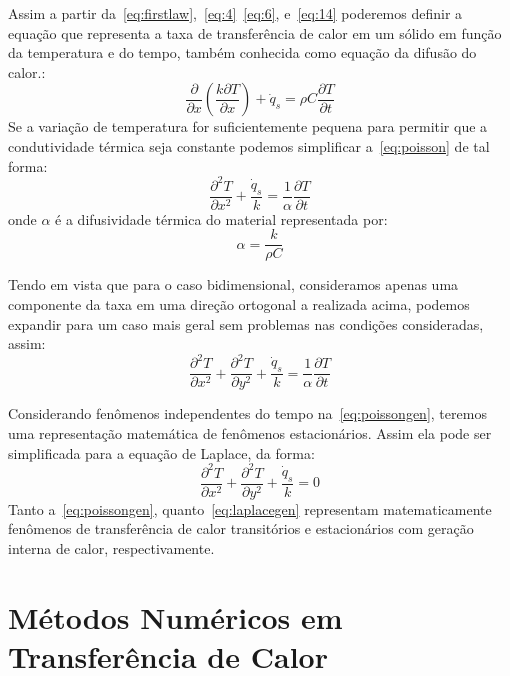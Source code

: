 \documentclass[
	12pt,				  %
	openright,		%
	twoside,			%
	a4paper,			%
	chapter=TITLE,		    %
	english,			%
	brazil				%
	]{abntex2}
\begin{document}
Assim a partir
da~\autoref{eq:firstlaw},~\autoref{eq:4}~\autoref{eq:6}, e~\autoref{eq:14}
poderemos definir a equação que representa a taxa de transferência de
calor em um sólido em função da temperatura e do tempo, também
conhecida como equação da difusão do calor.:
\begin{equation}
    \frac{\partial}{\partial x}\left( \frac{k \partial T}{\partial x}
    \right) + \dot{q}_s = \rho C \frac{\partial T}{\partial t}
    \label{eq:poisson}
\end{equation}
Se a variação de temperatura for suficientemente pequena para permitir que a
condutividade térmica seja constante podemos simplificar a~\autoref{eq:poisson}
de tal forma:
\begin{equation}
    \frac{\partial^2 T}{\partial x^2} + \frac{\dot{q}_s}{k} =
    \frac{1}{\alpha}\frac{\partial T}{\partial t}
\end{equation}
onde $\alpha$ é a difusividade térmica do material representada por:
\begin{equation}
    \alpha = \frac{k}{\rho C}
\end{equation}

Tendo em vista que para o caso bidimensional, consideramos apenas uma
componente da taxa em uma direção ortogonal a realizada acima, podemos expandir
para um caso mais geral sem problemas nas condições consideradas, assim:
\begin{equation}
    \frac{\partial^2 T}{\partial x^2} + \frac{\partial^2 T}{\partial y^2} + \frac{\dot{q}_s}{k} =
    \frac{1}{\alpha}\frac{\partial T}{\partial t} \label{eq:poissongen}
\end{equation}

Considerando fenômenos independentes do tempo na~\autoref{eq:poissongen},
teremos uma representação matemática de fenômenos estacionários. Assim ela pode
ser simplificada para a equação de Laplace, da forma:
\begin{equation}
    \frac{\partial^2 T}{\partial x^2} + \frac{\partial^2 T}{\partial y^2} + \frac{\dot{q}_s}{k} =
    0 \label{eq:laplacegen}
\end{equation}
Tanto a~\autoref{eq:poissongen}, quanto~\autoref{eq:laplacegen} representam
matematicamente fenômenos de transferência de calor transitórios e
estacionários com geração interna de calor, respectivamente.

\section{Métodos Numéricos em Transferência de Calor}\label{chap:metnum}
\end{document}
